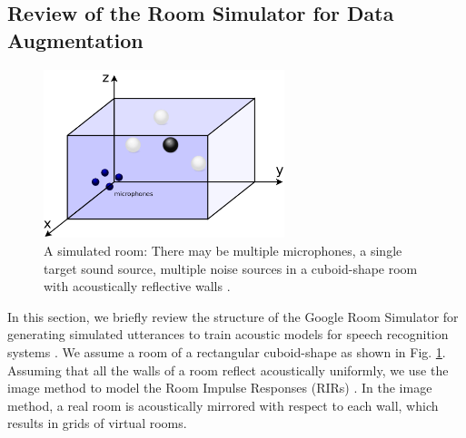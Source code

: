 \documentclass[a4paper]{article}
\begin{document}
\subsection{Review of the Room Simulator for Data Augmentation}
%
%
\begin{figure}
  \begin{center}
    \includegraphics[width=70mm]{room_diagram.pdf}
   \caption{
    A simulated room: There may be multiple microphones, a single target
    sound source, multiple noise sources in a cuboid-shape room with
    acoustically reflective walls \cite{C_Kim_INTERSPEECH_2017_1}. 
    \label{fig:room_diagram}
  }
  \end{center}
  \vspace{-10mm}
\end{figure}
%
%
In this section, we briefly review the structure of the Google
Room Simulator for generating simulated utterances
to train acoustic models for speech recognition systems
\cite{C_Kim_INTERSPEECH_2017_1}. We assume a room of a
rectangular cuboid-shape as shown in Fig. \ref{fig:room_diagram}.
Assuming that all the walls of a room reflect acoustically uniformly,
we use the image method to model the Room Impulse Responses (RIRs)
\cite{J_Allen_JASA_1979, E_A_Lehmann_ASPAA_2007,
s_g_mcgovern_mathworks_file_exchange_2013_00,
s_g_mcgovern_applied_acoustics_2009_00}.
In the image method, a real room is acoustically mirrored
with respect to each wall, which results in grids of virtual rooms.
%
\end{document}
